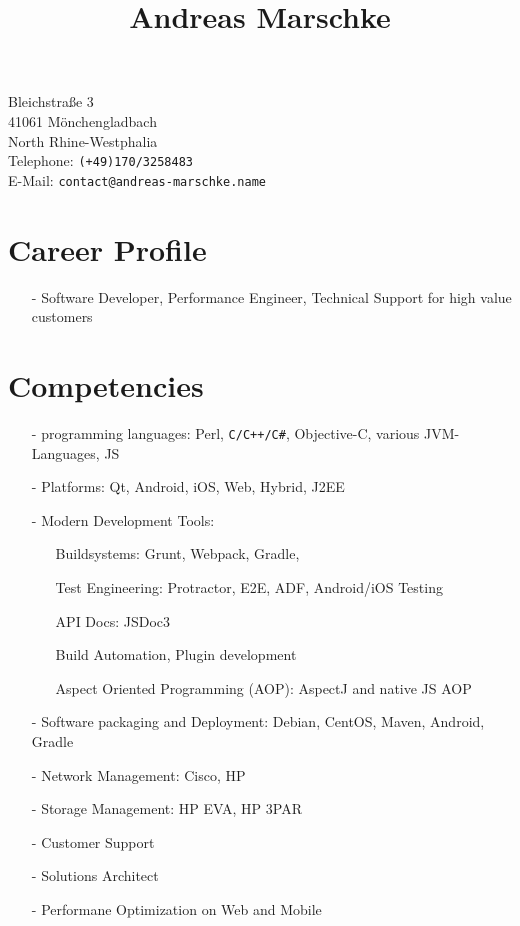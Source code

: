 \documentclass[12pt]{article}
\title{Andreas Marschke}
\date{}
\begin{document}
\maketitle

Bleichstraße 3 \\
41061 Mönchengladbach \\
North Rhine-Westphalia \\
Telephone: \texttt{(+49)170/3258483} \\
E-Mail: \texttt{contact@andreas-marschke.name}

\thispagestyle{empty}
\section*{Career Profile}
\begin{itemize}
\item[-] Software Developer, Performance Engineer, Technical Support for high value customers
\end{itemize}
\section*{Competencies}
\begin{itemize}
\item[-] programming languages: Perl, \verb*|C/C++/C#|, Objective-C, various JVM-Languages, JS
\item[-] Platforms: Qt, Android, iOS, Web, Hybrid, J2EE
\item[-] Modern Development Tools:
  \begin{itemize}
  \item[] Buildsystems: Grunt, Webpack, Gradle,
  \item[] Test Engineering: Protractor, E2E, ADF, Android/iOS Testing
  \item[] API Docs: JSDoc3
  \item[] Build Automation, Plugin development
  \item[] Aspect Oriented Programming (AOP): AspectJ and native JS AOP
  \end{itemize}
\item[-] Software packaging and Deployment: Debian, CentOS, Maven, Android, Gradle
\item[-] Network Management: Cisco, HP
\item[-] Storage Management: HP EVA, HP 3PAR
\item[-] Customer Support
\item[-] Solutions Architect
\item[-] Performane Optimization on Web and Mobile
\end{itemize}
\end{document}
